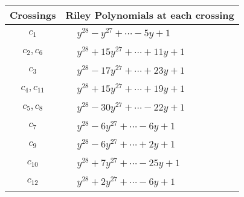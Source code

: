 \documentclass[1p]{elsarticle_modified}
\theoremstyle{definition}
\begin{document}
\begin{tabular}{m{50pt}|m{274pt}}
Crossings & \hspace{64pt}Riley Polynomials at each crossing \\
\hline $$\begin{aligned}c_{1}\end{aligned}$$&$\begin{aligned}
&y^{28}- y^{27}+\cdots-5 y+1
\end{aligned}$\\
\hline $$\begin{aligned}c_{2},c_{6}\end{aligned}$$&$\begin{aligned}
&y^{28}+15 y^{27}+\cdots+11 y+1
\end{aligned}$\\
\hline $$\begin{aligned}c_{3}\end{aligned}$$&$\begin{aligned}
&y^{28}-17 y^{27}+\cdots+23 y+1
\end{aligned}$\\
\hline $$\begin{aligned}c_{4},c_{11}\end{aligned}$$&$\begin{aligned}
&y^{28}+15 y^{27}+\cdots+19 y+1
\end{aligned}$\\
\hline $$\begin{aligned}c_{5},c_{8}\end{aligned}$$&$\begin{aligned}
&y^{28}-30 y^{27}+\cdots-22 y+1
\end{aligned}$\\
\hline $$\begin{aligned}c_{7}\end{aligned}$$&$\begin{aligned}
&y^{28}-6 y^{27}+\cdots-6 y+1
\end{aligned}$\\
\hline $$\begin{aligned}c_{9}\end{aligned}$$&$\begin{aligned}
&y^{28}-6 y^{27}+\cdots+2 y+1
\end{aligned}$\\
\hline $$\begin{aligned}c_{10}\end{aligned}$$&$\begin{aligned}
&y^{28}+7 y^{27}+\cdots-25 y+1
\end{aligned}$\\
\hline $$\begin{aligned}c_{12}\end{aligned}$$&$\begin{aligned}
&y^{28}+2 y^{27}+\cdots-6 y+1
\end{aligned}$\\
\hline
\end{tabular}\\~\\
\end{document}
